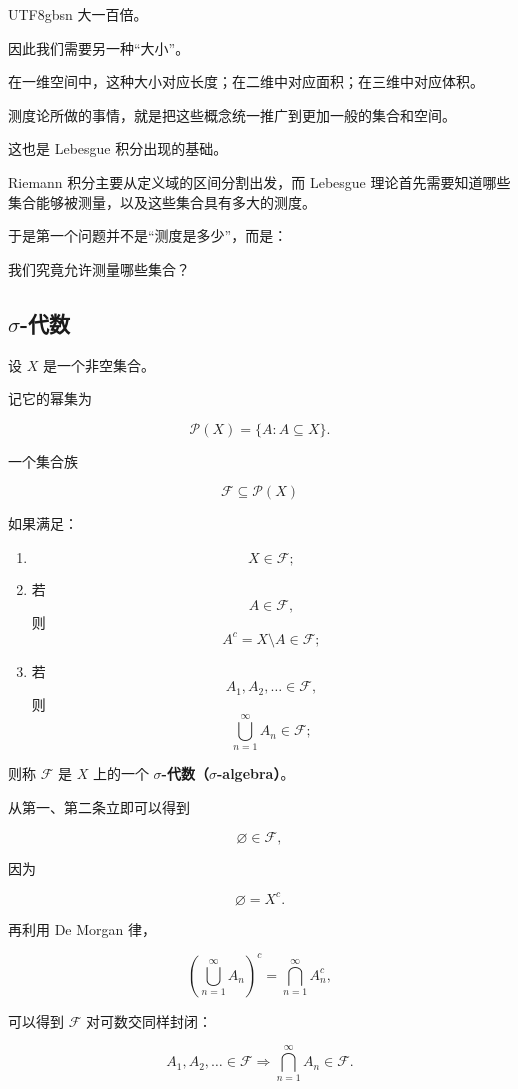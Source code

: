 \documentclass[11pt]{article}
\begin{document}
\begin{CJK*}{UTF8}{gbsn}
大一百倍。

因此我们需要另一种“大小”。

在一维空间中，这种大小对应长度；在二维中对应面积；在三维中对应体积。

测度论所做的事情，就是把这些概念统一推广到更加一般的集合和空间。

这也是 Lebesgue 积分出现的基础。

Riemann 积分主要从定义域的区间分割出发，而 Lebesgue 理论首先需要知道哪些集合能够被测量，以及这些集合具有多大的测度。

于是第一个问题并不是“测度是多少”，而是：

我们究竟允许测量哪些集合？

\subsection{$\sigma$-代数}

设 $X$ 是一个非空集合。

记它的幂集为

\[
\mathcal{P}(X)=\{A:A\subseteq X\}.
\]

一个集合族

\[
\mathcal{F}\subseteq\mathcal{P}(X)
\]

如果满足：

\begin{enumerate}
  \item \[
  X\in\mathcal{F};
  \]
  \item 若
  \[
  A\in\mathcal{F},
  \]
  则
  \[
  A^{c}=X\setminus A\in\mathcal{F};
  \]
  \item 若
  \[
  A_{1},A_{2},\ldots\in\mathcal{F},
  \]
  则
  \[
  \bigcup_{n=1}^{\infty}A_{n}\in\mathcal{F};
  \]
\end{enumerate}

则称 $\mathcal{F}$ 是 $X$ 上的一个 \textbf{$\sigma$-代数（$\sigma$-algebra）}。

从第一、第二条立即可以得到

\[
\varnothing\in\mathcal{F},
\]

因为

\[
\varnothing=X^{c}.
\]

再利用 De Morgan 律，

\[
\left(\bigcup_{n=1}^{\infty}A_{n}\right)^{c}=\bigcap_{n=1}^{\infty}A_{n}^{c},
\]

可以得到 $\mathcal{F}$ 对可数交同样封闭：

\[
A_{1},A_{2},\ldots\in\mathcal{F}\Longrightarrow\bigcap_{n=1}^{\infty}A_{n}\in\mathcal{F}.
\]


\end{CJK*}
\end{document}
